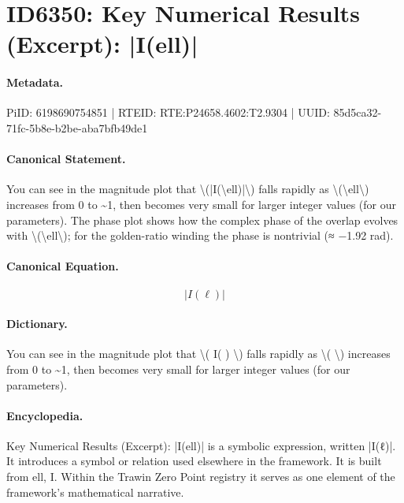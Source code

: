 \section*{ID6350: Key Numerical Results (Excerpt): |I(ell)|}
\paragraph{Metadata.}
PiID: 6198690754851 | RTEID: RTE:P24658.4602:T2.9304 | UUID: 85d5ca32-71fc-5b8e-b2be-aba7bfb49de1

\paragraph{Canonical Statement.}
You can see in the magnitude plot that \textbackslash{}(|I(\textbackslash{}ell)|\textbackslash{}) falls rapidly as \textbackslash{}(\textbackslash{}ell\textbackslash{}) increases from 0 to \textasciitilde{}1, then becomes very small for larger integer values (for our parameters). The phase plot shows how the complex phase of the overlap evolves with \textbackslash{}(\textbackslash{}ell\textbackslash{}); for the golden-ratio winding the phase is nontrivial (≈ −1.92 rad).

\paragraph{Canonical Equation.}
\[
|I(\ell)|
\]

\paragraph{Dictionary.}
You can see in the magnitude plot that \textbackslash{}( I( ) \textbackslash{}) falls rapidly as \textbackslash{}( \textbackslash{}) increases from 0 to \textasciitilde{}1, then becomes very small for larger integer values (for our parameters).

\paragraph{Encyclopedia.}
Key Numerical Results (Excerpt): |I(ell)| is a symbolic expression, written |I(ℓ)|. It introduces a symbol or relation used elsewhere in the framework. It is built from ell, I. Within the Trawin Zero Point registry it serves as one element of the framework's mathematical narrative.
